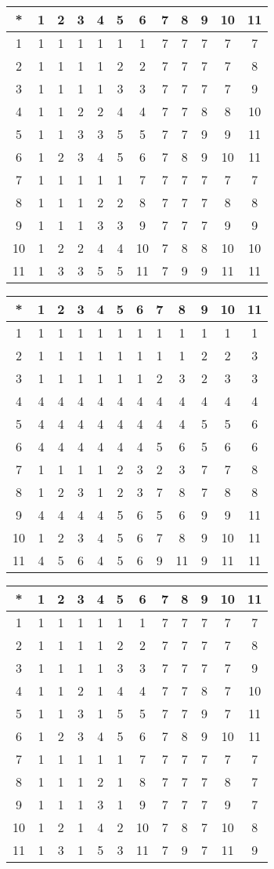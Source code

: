 \begin{tabular}[t]{c|ccccccccccc}
*&1&2&3&4&5&6&7&8&9&10&11 \\ \hline
    1&1&1&1&1&1&1&7&7&7&7&7 \\
    2&1&1&1&1&2&2&7&7&7&7&8 \\
    3&1&1&1&1&3&3&7&7&7&7&9 \\
    4&1&1&2&2&4&4&7&7&8&8&10 \\
    5&1&1&3&3&5&5&7&7&9&9&11 \\
    6&1&2&3&4&5&6&7&8&9&10&11 \\
    7&1&1&1&1&1&7&7&7&7&7&7 \\
    8&1&1&1&2&2&8&7&7&7&8&8 \\
    9&1&1&1&3&3&9&7&7&7&9&9 \\
    10&1&2&2&4&4&10&7&8&8&10&10 \\
    11&1&3&3&5&5&11&7&9&9&11&11 
\end{tabular}


\begin{tabular}[t]{c|ccccccccccc}
*&1&2&3&4&5&6&7&8&9&10&11 \\ \hline
    1&1&1&1&1&1&1&1&1&1&1&1 \\
    2&1&1&1&1&1&1&1&1&2&2&3 \\
    3&1&1&1&1&1&1&2&3&2&3&3 \\
    4&4&4&4&4&4&4&4&4&4&4&4 \\
    5&4&4&4&4&4&4&4&4&5&5&6 \\
    6&4&4&4&4&4&4&5&6&5&6&6 \\
    7&1&1&1&1&2&3&2&3&7&7&8 \\
    8&1&2&3&1&2&3&7&8&7&8&8 \\
    9&4&4&4&4&5&6&5&6&9&9&11 \\
    10&1&2&3&4&5&6&7&8&9&10&11 \\
    11&4&5&6&4&5&6&9&11&9&11&11 
\end{tabular}


\begin{tabular}[t]{c|ccccccccccc}
*&1&2&3&4&5&6&7&8&9&10&11 \\ \hline
    1&1&1&1&1&1&1&7&7&7&7&7 \\
    2&1&1&1&1&2&2&7&7&7&7&8 \\
    3&1&1&1&1&3&3&7&7&7&7&9 \\
    4&1&1&2&1&4&4&7&7&8&7&10 \\
    5&1&1&3&1&5&5&7&7&9&7&11 \\
    6&1&2&3&4&5&6&7&8&9&10&11 \\
    7&1&1&1&1&1&7&7&7&7&7&7 \\
    8&1&1&1&2&1&8&7&7&7&8&7 \\
    9&1&1&1&3&1&9&7&7&7&9&7 \\
    10&1&2&1&4&2&10&7&8&7&10&8 \\
    11&1&3&1&5&3&11&7&9&7&11&9 
\end{tabular}


